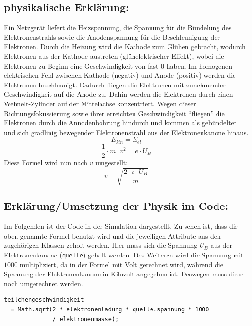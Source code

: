 \subsection{physikalische Erklärung:}
\label{sec:tolle-section}
 
Ein Netzgerät liefert die Heizspannung, die Spannung für die Bündelung des Elektronenstrahls sowie die Anodenspannung für die Beschleunigung der Elektronen.
Durch die Heizung wird die Kathode zum Glühen gebracht, wodurch Elektronen aus der Kathode austreten (glühelektrischer Effekt), wobei die Elektronen zu Beginn eine Geschwindigkeit von fast $0$ haben.
Im homogenen elektrischen Feld zwischen Kathode (negativ) und Anode (positiv) werden die Elektronen beschleunigt.
Dadurch fliegen die Elektronen mit zunehmender Geschwindigkeit auf die Anode zu.
Dahin werden die Elektronen durch einen Wehnelt-Zylinder auf der Mittelachse konzentriert.
Wegen dieser Richtungsfokussierung sowie ihrer erreichten Geschwindigkeit "`fliegen"' die Elektronen durch die Annodenbohrung hindurch und kommen als gebündelter und sich gradlinig bewegender Elektronenstrahl aus der Elektronenkanone hinaus.
$$ E_{kin} = E_{el}$$
$$ \frac{1}{2} \cdot m \cdot v^2 = e \cdot U_B$$
Diese Formel wird  nun nach $v$ umgestellt:
\begin{equation}
\label{eq:v}
   v = \sqrt{\frac{2 \cdot e \cdot U_B}{m}} 
\end{equation}
$$ $$

\subsection{Erklärung/Umsetzung der Physik im Code:}

Im Folgenden ist der Code in der Simulation dargestellt.
Zu sehen ist, dass die oben genannte Formel benutzt wird und die jeweiligen Attribute aus den zugehörigen Klassen geholt werden.
Hier muss sich die Spannung $U_B$ aus der Elektronenkanone (\lstinline$quelle$)  geholt werden.
Des Weiteren wird die Spannung mit $1000$ multipliziert, da in der Formel mit Volt gerechnet wird, während die Spannung der Elektronenkanone in Kilovolt angegeben ist. Deswegen muss diese noch umgerechnet werden.

\begin{lstlisting}
teilchengeschwindigkeit 
  = Math.sqrt(2 * elektronenladung * quelle.spannung * 1000 
              / elektronenmasse);
\end{lstlisting}

